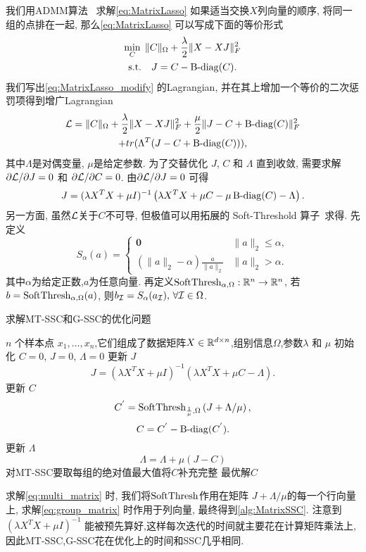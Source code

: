 我们用ADMM算法~\cite{stephen2011distributed} 求解\eqref{eq:MatrixLasso} 
如果适当交换\(X\)列向量的顺序, 将同一组的点排在一起, 
那么\eqref{eq:MatrixLasso} 可以写成下面的等价形式
\begin{equation}\label{eq:MatrixLasso_modify}
  \begin{gathered}
    \min_{C} \; \|C\|_{\Omega}+\frac{\lambda}{2}\|X-XJ\|_F^2 \\
    \text{s.t.} \quad J=C-\operatorname{B-diag}(C).
  \end{gathered}
\end{equation}
我们写出\eqref{eq:MatrixLasso_modify} 的Lagrangian,
并在其上增加一个等价的二次惩罚项得到增广Lagrangian
\begin{multline*}
  \mathcal{L}= \|C\|_{\Omega}+\frac{\lambda}{2}\|X-XJ\|_F^2 
  +\frac{\mu}{2}\|J-C+\operatorname{B-diag}(C)\|_F^2\\
  +tr(\Lambda^T(J-C+\operatorname{B-diag}(C))),
\end{multline*}
其中\(\Lambda\)是对偶变量, \(\mu\)是给定参数. 为了交替优化
\(J\), \(C\) 和 \(\Lambda\) 直到收敛, 需要求解 \(\partial \mathcal{L}/\partial J=0\)
和 \(\partial \mathcal{L}/\partial C=0\). 由\(\partial \mathcal{L}/\partial J=0\) 可得
\[
  J=(\lambda X^TX+\mu I)^{-1}\left(\lambda X^TX+\mu C - 
  \mu\operatorname{B-diag}(C)-\Lambda\right).
\]
另一方面, 虽然\(\mathcal{L}\)关于\(C\)不可导, 但极值可以用拓展的
Soft-Threshold 算子~\cite{donoho1995noising}求得.
先定义
\begin{equation*}
  S_\alpha(a) = \begin{cases}
    \mathbf{0} & \|a\|_2 \le \alpha, \\
    (\|a\|_2 - \alpha) \frac{a}{\|a\|_2} & \|a\|_2 > \alpha.
  \end{cases}
\end{equation*}
其中\(\alpha\)为给定正数,\(a\)为任意向量.
再定义\(\operatorname{SoftThresh}_{\alpha,\Omega}:\mathbb{R}^n\rightarrow \mathbb{R}^n\), 若
\(b =\operatorname{SoftThresh}_{\alpha,\Omega}(a)\), 则\( b_{\mathcal{I}}= S_\alpha(a_{\mathcal{I}}),
\, \forall \mathcal{I} \in \Omega\).

\begin{algorithm}[tb]
  \caption{求解MT-SSC和G-SSC的优化问题}
  \label{alg:MatrixSSC}
  \begin{algorithmic}
    \(n\) 个样本点 \(x_1,\ldots,x_n\),它们组成了数据矩阵\(X\in \mathbb{R}^{d\times
    n}\),组别信息\(\Omega\),参数\(\lambda\) 和 \(\mu\)
    \State 初始化 \(C=0\), \(J=0\), \(\Lambda=0\)
     更新 \(J\) 
    \[J=(\lambda X^TX+\mu I)^{-1}(\lambda X^TX+\mu C-\Lambda).\]
     更新 \(C\)
    \[ C^{'}=\operatorname{SoftThresh}_{\frac{1}{\mu},\Omega}\left(J+\Lambda/\mu\right), \]
    \[ C=C^{'}-\operatorname{B-diag}(C^{'}).\]
     更新 \(\Lambda\)
    \[\Lambda=\Lambda+\mu(J-C)\]
    \EndWhile
    \State 对MT-SSC要取每组的绝对值最大值将\(C\)补充完整
     最优解\(C\)
  \end{algorithmic}
\end{algorithm}
求解\eqref{eq:multi_matrix} 时, 我们将\(\operatorname{SoftThresh}\)作用在矩阵
\(J+\Lambda/\mu\)的每一个行向量上,
求解\eqref{eq:group_matrix} 时作用于列向量,
最终得到\autoref{alg:MatrixSSC}.
注意到 \((\lambda X^TX+\mu I)^{-1}\)
能被预先算好,这样每次迭代的时间就主要花在计算矩阵乘法上,
因此MT-SSC,G-SSC花在优化上的时间和SSC几乎相同.
